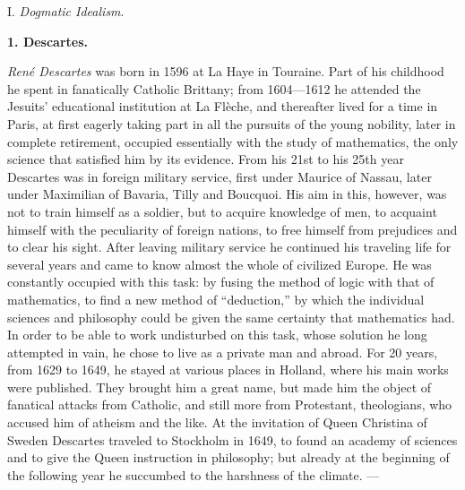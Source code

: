 \begin{center}
  I. \emph{Dogmatic Idealism}.
\end{center}

\begin{center}
  \textbf{1. Descartes.}
\end{center}

\emph{René Descartes} was born in 1596 at La Haye in Touraine.
Part of his childhood he spent in fanatically Catholic Brittany; from 1604---1612 he attended the Jesuits' educational institution at La Flèche, and thereafter lived for a time in Paris, at first eagerly taking part in all the pursuits of the young nobility, later in complete retirement, occupied essentially with the study of mathematics, the only science that satisfied him by its evidence. From his 21st to his 25th year Descartes was in foreign military service, first under Maurice of Nassau, later under Maximilian of Bavaria, Tilly and Boucquoi. His aim in this, however, was not to train himself as a soldier, but to acquire knowledge of men, to acquaint himself with the peculiarity of foreign nations, to free himself from prejudices and to clear his sight. After leaving military service he continued his traveling life for several years and came to know almost the whole of civilized Europe. He was constantly occupied with this task: by fusing the method of logic with that of mathematics, to find a new method of ``deduction,'' by which the individual sciences and philosophy could be given the same certainty that mathematics had. In order to be able to work undisturbed on this task, whose solution he long attempted in vain, he chose to live as a private man and abroad. For 20 years, from 1629 to 1649, he stayed at various places in Holland, where his main works were published. They brought him a great name, but made him the object of fanatical attacks from Catholic, and still more from Protestant, theologians, who accused him of atheism and the like. At the invitation of Queen Christina of Sweden Descartes traveled to Stockholm in 1649, to found an academy of sciences and to give the Queen instruction in philosophy; but already at the beginning of the following year he succumbed to the harshness of the climate. ---
